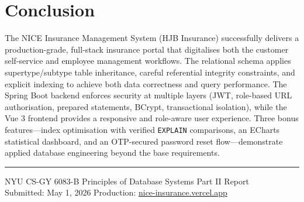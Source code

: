 \documentclass[12pt,letterpaper]{article}
\begin{document}
\section{Conclusion}

The NICE Insurance Management System (HJB Insurance) successfully delivers a production-grade, full-stack insurance portal that digitalises both the customer self-service and employee management workflows. The relational schema applies supertype/subtype table inheritance, careful referential integrity constraints, and explicit indexing to achieve both data correctness and query performance. The Spring Boot backend enforces security at multiple layers (JWT, role-based URL authorisation, prepared statements, BCrypt, transactional isolation), while the Vue 3 frontend provides a responsive and role-aware user experience. Three bonus features---index optimisation with verified \texttt{EXPLAIN} comparisons, an ECharts statistical dashboard, and an OTP-secured password reset flow---demonstrate applied database engineering beyond the base requirements.

\vspace{1cm}
\noindent\rule{\linewidth}{0.4pt}
\begin{center}
\small\color{gray}
NYU CS-GY 6083-B \quad Principles of Database Systems \quad Part II Report \\
Submitted: May 1, 2026 \quad Production: \href{https://nice-insurance.vercel.app}{nice-insurance.vercel.app}
\end{center}
\end{document}
